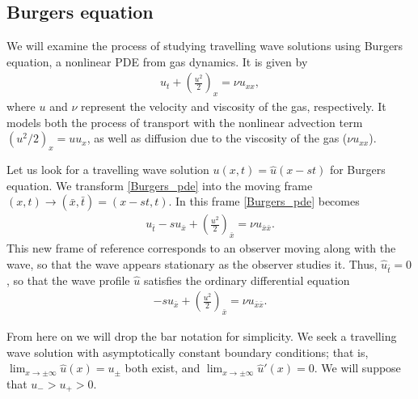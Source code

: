 \subsection*{Burgers equation}
We will examine the process of studying travelling wave solutions using Burgers equation, a nonlinear PDE from gas dynamics. It is given by
\begin{align}
	u_t + \left( \frac{u^2}{2} \right)_x = \nu u_{xx}, \label{Burgers_pde}
\end{align}
where $u$ and $\nu$ represent the velocity and viscosity of the gas, respectively. It models both the process of transport with the nonlinear advection term $(u^2/2)_x = u u_x$, as well as diffusion due to the viscosity of the 
gas ($\nu u_{xx}$).

Let us look for a travelling wave solution $u(x,t) = \hat{u}(x-st)$ for Burgers equation. 
We transform \eqref{Burgers_pde} into the moving frame $(x,t) \to (\bar{x},\bar{t}) = (x-st, t)$. In this frame \eqref{Burgers_pde} becomes 
\begin{align}
	u_{\bar{t}} -su_{\bar{x}}+ \left( \frac{u^2}{2} \right)_{\bar{x}} = \nu u_{\bar{x}\bar{x}}. \label{Burgers_pde_moving frame}
\end{align}
This new frame of reference corresponds to an observer moving along with the wave, so that the wave appears stationary as the observer studies it.  Thus, $\hat{u}_{\bar{t}} = 0$, so that the wave profile 
$\hat{u}$ satisfies the ordinary differential equation 
\begin{align}
	 -su_{\bar{x}}+ \left( \frac{u^2}{2} \right)_{\bar{x}} = \nu u_{\bar{x}\bar{x}}. \label{Burgers_ode}
\end{align}

From here on we will drop the bar notation for simplicity. We seek a travelling wave solution with asymptotically constant boundary conditions; that is,  $\lim_{x \to \pm \infty}\hat{u}(x) = u_{\pm}$
both exist, and  $\lim_{x \to \pm \infty} \hat{u}'(x) = 0$. We will suppose that $u_- > u_+ > 0$.


